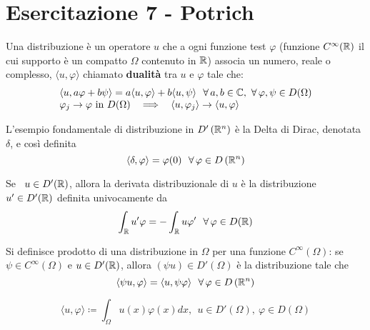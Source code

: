 \chapter{Esercitazione 7 - Potrich}
\ParteEsercizi
\begin{defn}
[Distribuzione] Una distribuzione è un operatore $u$ che a ogni funzione test $\varphi $ (funzione $C^{\infty }(\mathbb{R} )$ il cui supporto è un compatto $\Omega $ contenuto in $\mathbb{R} $) associa un numero, reale o complesso, $\langle u,\varphi \rangle $ chiamato \textbf{dualità} tra $u$ e $\varphi $ tale che:
\begin{equation*}
\begin{array}{ l }
\langle u,a\varphi +b\psi \rangle =a\langle u,\varphi \rangle +b\langle u,\psi \rangle \ \ \forall a,b\in \CC  ,\ \forall \varphi ,\psi \in D( \Omega )\\
\varphi _{j}\rightarrow \varphi \ \text{in} \ D( \Omega ) \ \ \implies \ \ \langle u,\varphi _{j} \rangle \rightarrow \langle u,\varphi \rangle 
\end{array}
\end{equation*}
\end{defn}
\begin{rem}
 L'esempio fondamentale di distribuzione in $D'\left(\mathbb{R} ^{n}\right)$ è la Delta di Dirac, denotata $\delta $, e così definita
\begin{equation*}
\langle \delta ,\varphi \rangle =\varphi ( 0) \ \ \forall \varphi \in D\left(\RR ^{n}\right)
\end{equation*}
\end{rem}
\begin{defn}
Se \ $u\in D'(\mathbb{R} )$, allora la derivata distribuzionale di $u$ è la distribuzione $u'\in D'(\mathbb{R} )$ definita univocamente da
\begin{equation*}
\int _{\RR } u'\varphi =-\int _{\RR } u\varphi '\ \ \forall \varphi \in D(\RR )
\end{equation*}
\end{defn}
\begin{defn}
Si definisce prodotto di una distribuzione in $\Omega $ per una funzione $C^{\infty }( \Omega )$: se $\psi \in C^{\infty }( \Omega )$ e $u\in D'(\mathbb{R} )$, allora $( \psi u) \in D'( \Omega )$ è la distribuzione tale che
\begin{equation*}
\langle \psi u,\varphi \rangle =\langle u,\psi \varphi \rangle \ \ \forall \varphi \in D\left(\RR ^{n}\right)
\end{equation*}
\end{defn}
\begin{rem}
\begin{equation*}
\langle u,\varphi \rangle \coloneqq \int _{\Omega } u( x) \varphi ( x) dx,\ \ u\in D'( \Omega ) ,\ \varphi \in D( \Omega )
\end{equation*}
\end{rem}
\Esercizio{}

